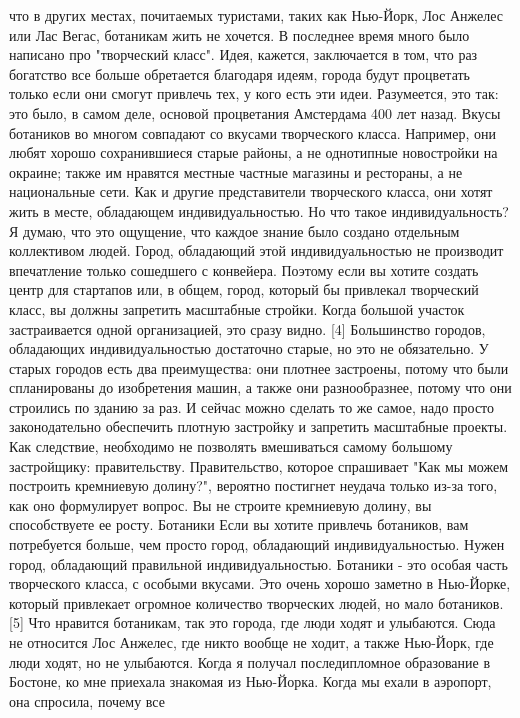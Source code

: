 \documentclass[ebook,12pt,oneside,openany]{memoir}
\begin{document}
что в других местах, почитаемых туристами, таких как Нью-Йорк, Лос
Анжелес или Лас Вегас, ботаникам жить не хочется. В последнее время
много было написано про "творческий класс". Идея, кажется, заключается
в том, что раз богатство все больше обретается благодаря идеям, города
будут процветать только если они смогут привлечь тех, у кого есть эти
идеи. Разумеется, это так: это было, в самом деле, основой процветания
Амстердама 400 лет назад. Вкусы ботаников во многом совпадают со
вкусами творческого класса. Например, они любят хорошо сохранившиеся
старые районы, а не однотипные новостройки на окраине; также им
нравятся местные частные магазины и рестораны, а не национальные сети.
Как и другие представители творческого класса, они хотят жить в месте,
обладающем индивидуальностью. Но что такое индивидуальность? Я думаю,
что это ощущение, что каждое знание было создано отдельным коллективом
людей. Город, обладающий этой индивидуальностью не производит
впечатление только сошедшего с конвейера. Поэтому если вы хотите
создать центр для стартапов или, в общем, город, который бы привлекал
творческий класс, вы должны запретить масштабные стройки. Когда
большой участок застраивается одной организацией, это сразу видно. [4]
Большинство городов, обладающих индивидуальностью достаточно старые,
но это не обязательно. У старых городов есть два преимущества: они
плотнее застроены, потому что были спланированы до изобретения машин,
а также они разнообразнее, потому что они строились по зданию за раз.
И сейчас можно сделать то же самое, надо просто законодательно
обеспечить плотную застройку и запретить масштабные проекты. Как
следствие, необходимо не позволять вмешиваться самому большому
застройщику: правительству. Правительство, которое спрашивает "Как мы
можем построить кремниевую долину?", вероятно постигнет неудача только
из-за того, как оно формулирует вопрос. Вы не строите кремниевую
долину, вы способствуете ее росту. Ботаники Если вы хотите привлечь
ботаников, вам потребуется больше, чем просто город, обладающий
индивидуальностью. Нужен город, обладающий правильной
индивидуальностью. Ботаники - это особая часть творческого класса, с
особыми вкусами. Это очень хорошо заметно в Нью-Йорке, который
привлекает огромное количество творческих людей, но мало ботаников.
[5] Что нравится ботаникам, так это города, где люди ходят и
улыбаются. Сюда не относится Лос Анжелес, где никто вообще не ходит, а
также Нью-Йорк, где люди ходят, но не улыбаются. Когда я получал
последипломное образование в Бостоне, ко мне приехала знакомая из
Нью-Йорка. Когда мы ехали в аэропорт, она спросила, почему все
\end{document}
